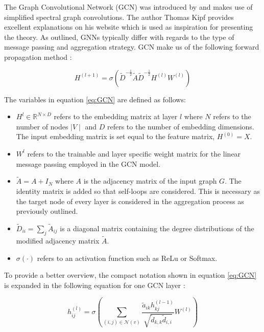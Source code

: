 	\noindent The Graph Convolutional Network (GCN) was introduced by 
	\cite{kipf2016semi} and makes use of simplified spectral graph
	convolutions. The author Thomas Kipf \citeyearpar{kipf2016online} provides 
	excellent explanations on his website which is used as inspiration for
	presenting the theory. As outlined, GNNs typically differ with regards to
	the type of message passing and aggregation strategy. GCN make us of the
	following forward propagation method \citep[p. 2]{kipf2016semi}:

	\begin{equation}
		H^{(l+1)} = \sigma\left(\tilde D^{-\frac{1}{2}}\tilde A \tilde
		D^{-\frac{1}{2}}H^{(l)}W^{(l)}\right)
		\label{eq:GCN}
	\end{equation}
	
	\noindent The variables in equation \ref{eq:GCN} are defined as follows:

	\begin{itemize}
		\item $H^{l}\in\mathbb{R}^{N \times D}$ refers to the embedding matrix
			at layer $l$ where $N$ refers to the number of nodes $\mid V \mid$
			and $D$ refers to the number of embedding dimensions. The input
			embedding matrix is set equal to the feature matrix, $H^{(0)}=X$.
		\item $W^{l}$ refers to the trainable and layer specific weight matrix
			for the linear message passing employed in the GCN model.
		\item $\tilde A = A + I_N$ where $A$ is the adjacency matrix of the
			input graph $G$. The identity matrix is added so that self-loops
			are considered. This is necessary as the target node of every layer
			is considered in the aggregation process as previously outlined.
		\item $\tilde D_{ii} = \sum_{j}\tilde A_{ij}$ is a diagonal matrix
			containing the degree distributions of the modified adjacency
			matrix $\tilde A$.
		\item $\sigma(\cdot)$ refers to an activation function such as ReLu or
			Softmax.
	\end{itemize}

	\noindent To provide a better overview, the compact notation shown in 
	equation \ref{eq:GCN} is expanded in the following equation for one GCN
	layer \citep{Dubois2019}:

	\begin{equation}
		h_{ij}^{(l)} = \sigma\left(\sum_{(i,j)\in
		\mathcal{N}(v)}\frac{\tilde a_{ik}h_{kj}^{(l-1)}}{\sqrt{\tilde
d_{k,k}\tilde d_{i,i}}} W^{(l)}\right)
		\label{eq:GCN_expand}
	\end{equation}
	
